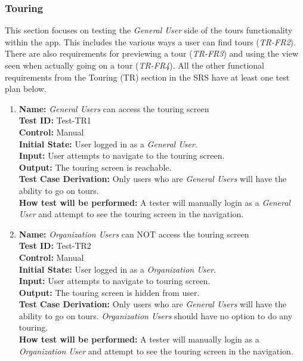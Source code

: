 \documentclass[12pt, titlepage]{article}
\begin{document}
\subsubsection{Touring}

This section focuses on testing the \textit{General User} side of the tours functionality within the app. This includes the various ways a user can find tours (\textit{TR-FR2}). There are also requirements for previewing a tour (\textit{TR-FR3}) and using the view seen when actually going on a tour (\textit{TR-FR4}). All the other functional requirements from the Touring (TR) section in the SRS \cite{SRS} have at least one test plan below.

\begin{enumerate}

    \item
    \textbf{Name:} \textit{General Users} can access the touring screen \label{itm:Test-TR1} \\
    \textbf{Test ID:} Test-TR1 \\
    \textbf{Control:} Manual \\
    \textbf{Initial State:} User logged in as a \textit{General User}. \\
    \textbf{Input:} User attempts to navigate to the touring screen. \\
    \textbf{Output:} The touring screen is reachable. \\
    \textbf{Test Case Derivation:} Only users who are \textit{General Users} will have the ability to go on tours. \\
    \textbf{How test will be performed:} A tester will manually login as a \textit{General User} and attempt to see the touring screen in the navigation.

    \item
    \textbf{Name:} \textit{Organization Users} can NOT access the touring screen \label{itm:Test-TR2} \\
    \textbf{Test ID:} Test-TR2 \\
    \textbf{Control:} Manual \\
    \textbf{Initial State:} User logged in as a \textit{Organization User}. \\
    \textbf{Input:} User attempts to navigate to touring screen. \\
    \textbf{Output:} The touring screen is hidden from user. \\
    \textbf{Test Case Derivation:} Only users who are \textit{General Users} will have the ability to go on tours. \textit{Organization Users} should have no option to do any touring. \\
    \textbf{How test will be performed:} A tester will manually login as a \textit{Organization User} and attempt to see the touring screen in the navigation.


\end{enumerate}
\end{document}
